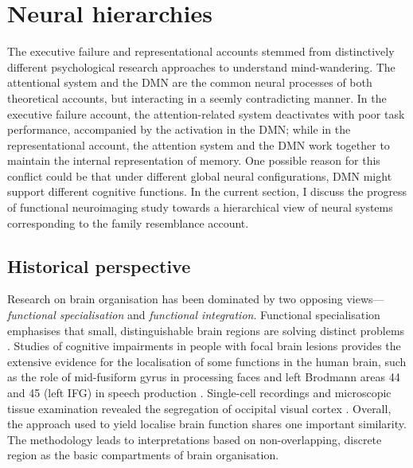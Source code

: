 \section{Neural hierarchies}
\label{ch:intro:neural}

The executive failure and representational accounts stemmed from distinctively different psychological research approaches to understand mind-wandering. The attentional system and the DMN are the common neural processes of both theoretical accounts, but interacting in a seemly contradicting manner. In the executive failure account, the attention-related system deactivates with poor task performance, accompanied by the activation in the DMN; while in the representational account, the attention system and the DMN work together to maintain the internal representation of memory. 
One possible reason for this conflict could be that under different global neural configurations, DMN might support different cognitive functions. 
In the current section, I discuss the progress of functional neuroimaging study towards a hierarchical view of neural systems corresponding to the family resemblance account.

\subsection{Historical perspective}

Research on brain organisation has been dominated by two opposing views---\textit{functional specialisation} and \textit{functional integration}. Functional specialisation emphasises that small, distinguishable brain regions are solving distinct problems \cite{Kanwisher2010}. Studies of cognitive impairments in people with focal brain lesions provides the extensive evidence for the localisation of some functions in the human brain, such as the role of mid-fusiform gyrus in processing faces \cite{Iaria2008} and left Brodmann areas 44 and 45 (left IFG) in speech production \cite{Broca1861}. Single-cell recordings and microscopic tissue examination revealed the segregation of occipital visual cortex \cite{Zeki1978}. Overall, the approach used to yield localise brain function shares one important similarity. The methodology leads to interpretations based on non-overlapping, discrete region as the basic compartments of brain organisation. 

